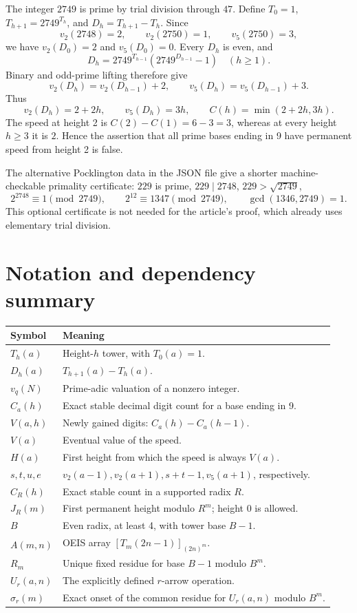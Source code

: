 \documentclass[11pt,letterpaper]{article}
\numberwithin{equation}{section}
\theoremstyle{definition}
\theoremstyle{remark}
\begin{document}
The integer $2749$ is prime by trial division through $47$. Define $T_0=1$, $T_{h+1}=2749^{T_h}$, and $D_h=T_{h+1}-T_h$. Since
\[
 v_2(2748)=2,\qquad v_2(2750)=1,\qquad v_5(2750)=3,
\]
we have $v_2(D_0)=2$ and $v_5(D_0)=0$. Every $D_h$ is even, and
\[
 D_h=2749^{T_{h-1}}(2749^{D_{h-1}}-1)\quad(h\ge1).
\]
Binary and odd-prime lifting therefore give
\[
 v_2(D_h)=v_2(D_{h-1})+2,\qquad
 v_5(D_h)=v_5(D_{h-1})+3.
\]
Thus
\[
 v_2(D_h)=2+2h,\qquad v_5(D_h)=3h,
 \qquad C(h)=\min(2+2h,3h).
\]
The speed at height 2 is $C(2)-C(1)=6-3=3$, whereas at every height $h\ge3$ it is $2$. Hence the assertion that all prime bases ending in 9 have permanent speed from height 2 is false.

The alternative Pocklington data in the JSON file give a shorter machine-checkable primality certificate: $229$ is prime, $229\mid2748$, $229>\sqrt{2749}$,
\[
 2^{2748}\equiv1\pmod{2749},\qquad
 2^{12}\equiv1347\pmod{2749},\qquad \gcd(1346,2749)=1.
\]
This optional certificate is not needed for the article's proof, which already uses elementary trial division.

\clearpage
\section{Notation and dependency summary}

\begin{longtable}{p{}p{}}
\toprule
Symbol&Meaning\\
\midrule
\endhead
$T_h(a)$&Height-$h$ tower, with $T_0(a)=1$.\\
$D_h(a)$&$T_{h+1}(a)-T_h(a)$.\\
$v_q(N)$&Prime-adic valuation of a nonzero integer.\\
$C_a(h)$&Exact stable decimal digit count for a base ending in 9.\\
$V(a,h)$&Newly gained digits: $C_a(h)-C_a(h-1)$.\\
$V(a)$&Eventual value of the speed.\\
$H(a)$&First height from which the speed is always $V(a)$.\\
$s,t,u,e$&$v_2(a-1),v_2(a+1),s+t-1,v_5(a+1)$, respectively.\\
$C_R(h)$&Exact stable count in a supported radix $R$.\\
$J_R(m)$&First permanent height modulo $R^m$; height 0 is allowed.\\
$B$&Even radix, at least 4, with tower base $B-1$.\\
$A(m,n)$&OEIS array $[T_m(2n-1)]_{(2n)^m}$.\\
$R_m$&Unique fixed residue for base $B-1$ modulo $B^m$.\\
$U_r(a,n)$&The explicitly defined $r$-arrow operation.\\
$\sigma_r(m)$&Exact onset of the common residue for $U_r(a,n)$ modulo $B^m$.\\
\bottomrule
\end{longtable}
\end{document}
